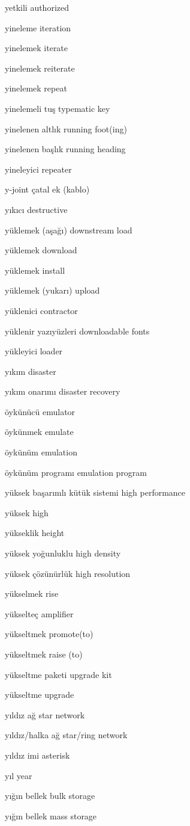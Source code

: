 \documentclass[12pt,fleqn]{article}\usepackage{../../common}
\begin{document}
yetkili authorized

yineleme iteration

yinelemek iterate

yinelemek reiterate

yinelemek repeat

yinelemeli tuş typematic key

yinelenen altlık running foot(ing)

yinelenen başlık running heading

yineleyici repeater

y-joint çatal ek (kablo)

yıkıcı destructive

yüklemek (aşağı) downstream load

yüklemek download

yüklemek install

yüklemek (yukarı) upload

yüklenici contractor

yüklenir yazıyüzleri downloadable fonts

yükleyici loader

yıkım disaster

yıkım onarımı disaster recovery

öykünücü emulator

öykünmek emulate

öykünüm emulation

öykünüm programı emulation program

yüksek başarımlı kütük sistemi high performance

yüksek high

yükseklik height

yüksek yoğunluklu high density

yüksek çözünürlük high resolution

yükselmek rise

yükselteç amplifier

yükseltmek promote(to)

yükseltmek raise (to)

yükseltme paketi upgrade kit

yükseltme upgrade

yıldız ağ star network

yıldız/halka ağ star/ring network

yıldız imi asterisk

yıl year

yığın bellek bulk storage

yığın bellek mass storage
\end{document}
